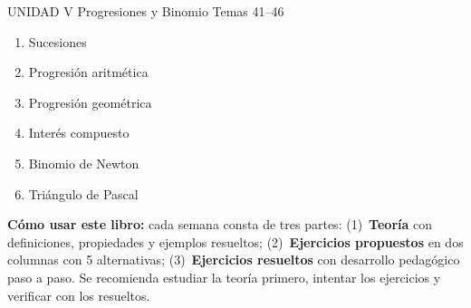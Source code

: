 \vspace{0.4cm}

\begin{tcolorbox}[
    enhanced,
    colback   = AzulPizarra,
    colframe  = DoradoAcadémico,
    arc = 3pt, boxrule = 1pt,
    left = 8pt, right = 8pt, top = 5pt, bottom = 5pt,
    fontupper = \sffamily\bfseries\color{white}
  ]
  UNIDAD V \hfill Progresiones y Binomio \hfill Temas 41–46
\end{tcolorbox}

\begin{multicols}{2}
  \begin{enumerate}[label=\textcolor{AzulPizarra}{\textbf{\arabic*.}},
      leftmargin=2em, itemsep=1pt, start=41]
    \item Sucesiones
    \item Progresión aritmética
    \item Progresión geométrica
    \item Interés compuesto
    \item Binomio de Newton
    \item Triángulo de Pascal
  \end{enumerate}
\end{multicols}

\vspace{0.6cm}

\begin{cajatip}
  \textbf{Cómo usar este libro:} cada semana consta de tres partes:
  (1)~\textbf{Teoría} con definiciones, propiedades y ejemplos resueltos;
  (2)~\textbf{Ejercicios propuestos} en dos columnas con 5 alternativas;
  (3)~\textbf{Ejercicios resueltos} con desarrollo pedagógico paso a paso.
  Se recomienda estudiar la teoría primero, intentar los ejercicios y
  verificar con los resueltos.
\end{cajatip}

\newpage